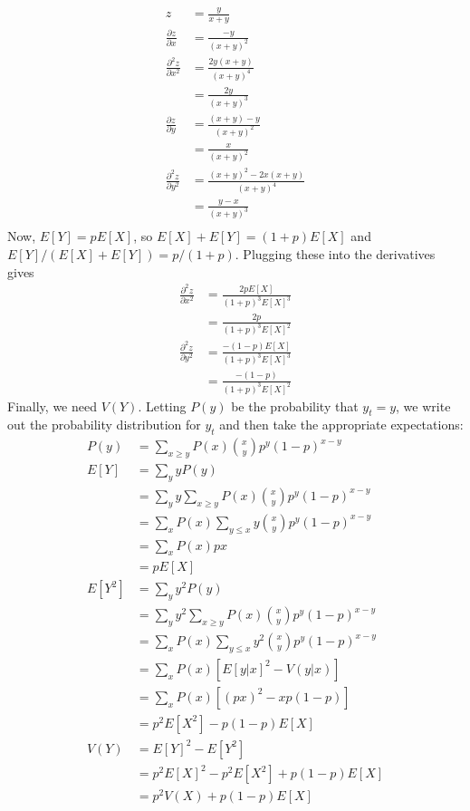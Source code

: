 \documentclass[
]{article}
\begin{document}
\[
\begin{aligned}
z &= \frac{y}{x+y}\\
\frac{\partial z}{\partial x} &= \frac{-y}{(x+y)^2}\\
\frac{\partial^2 z}{\partial x^2} &= \frac{2y(x+y)}{(x+y)^4}\\
    &= \frac{2y}{(x+y)^3}\\
\frac{\partial z}{\partial y} &= \frac{(x+y)-y}{(x+y)^2}\\
    &= \frac{x}{(x+y)^2}\\
\frac{\partial^2 z}{\partial y^2} &= \frac{(x+y)^2-2x(x+y)}{(x+y)^4}\\
    &= \frac{y-x}{(x+y)^3}\\
\end{aligned}
\] Now, \(E[Y] = p E[X]\), so \(E[X]+E[Y] = (1+p)E[X]\) and
\(E[Y]/(E[X]+E[Y])=p/(1+p)\). Plugging these into the derivatives gives
\[
\begin{aligned}
\frac{\partial^2 z}{\partial x^2} &=  \frac{2pE[X]}{(1+p)^3 E[X]^3}\\
    &= \frac{2p}{(1+p)^3 E[X]^2}\\
\frac{\partial^2 z}{\partial y^2} &= \frac{-(1-p)E[X]}{(1+p)^3 E[X]^3}\\
    &= \frac{-(1-p)}{(1+p)^3 E[X]^2}
\end{aligned}
\] Finally, we need \(V(Y)\). Letting \(P(y)\) be the probability that
\(y_t= y\), we write out the probability distribution for \(y_t\) and
then take the appropriate expectations: \[
\begin{aligned}
P(y) &= \sum_{x\ge y} P(x) {x \choose y} p^y (1-p)^{x-y}\\
E[Y] &= \sum_y y P(y)\\
  &= \sum_y y \sum_{x\ge y} P(x) {x \choose y} p^y (1-p)^{x-y}\\
  &= \sum_x P(x) \sum_{y \le x} y {x \choose y} p^y (1-p)^{x-y}\\
  &= \sum_x P(x) px\\
  &= p E[X]\\
E[Y^2] &= \sum_y y^2 P(y)\\
  &= \sum_y y^2 \sum_{x\ge y} P(x) {x \choose y} p^y (1-p)^{x-y}\\
  &= \sum_x P(x) \sum_{y \le x} y^2 {x \choose y} p^y (1-p)^{x-y}\\
  &= \sum_x P(x) [E[y|x]^2 - V(y|x)]\\
  &= \sum_x P(x) [(px)^2 - x p(1-p)]\\
  &= p^2 E[X^2] - p(1-p) E[X]\\
V(Y) &= E[Y]^2 - E[Y^2]\\
  &= p^2 E[X]^2 - p^2 E[X^2] + p(1-p) E[X]\\
  &= p^2 V(X) + p(1-p) E[X]
\end{aligned}
\]
\end{document}
